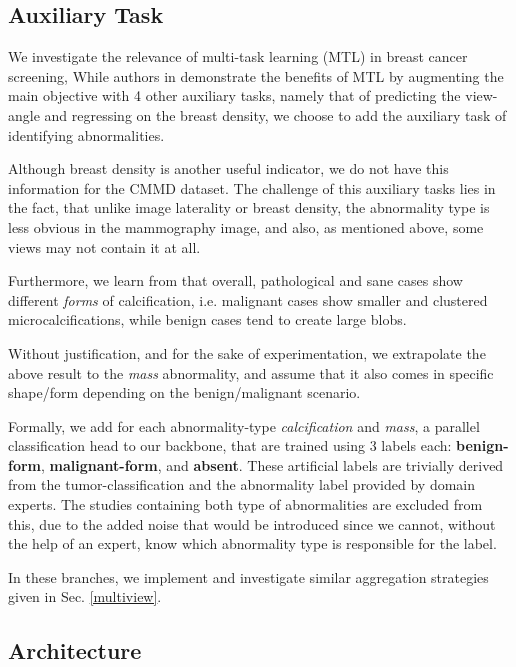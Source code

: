 \documentclass[11pt]{article}
\begin{document}
\subsection{Auxiliary Task}
\label{sec:org0c9880c}

We investigate the relevance of multi-task learning (MTL) in breast cancer screening,
While authors in \autocite{tardy22} demonstrate the benefits of MTL
by augmenting the main objective with
4 other auxiliary tasks, namely that of predicting the view-angle and
regressing on the breast density,
we choose to add the auxiliary task of identifying abnormalities.

Although breast density is another useful indicator, we do not have this information for the CMMD dataset. The challenge of this auxiliary tasks lies in the fact, that unlike image laterality or breast density, the abnormality type is less obvious in the mammography image, and also, as mentioned above, some views may not contain it at all.

Furthermore, we learn from \autocite{azam21} that overall, pathological and sane
cases show different \emph{forms} of calcification, i.e. malignant cases show smaller and clustered
microcalcifications, while benign cases tend to create large blobs.

Without justification, and for the sake of experimentation,
we extrapolate the above result to the \emph{mass} abnormality, and assume
that it also comes in specific shape/form depending on the benign/malignant
scenario.

Formally, we add for each abnormality-type \emph{calcification} and \emph{mass},
a parallel classification head to our backbone, that are trained using
3 labels each: \textbf{benign-form}, \textbf{malignant-form}, and \textbf{absent}.
These artificial labels are trivially derived from the tumor-classification and
the abnormality label provided by domain experts.
The studies containing both type of abnormalities are excluded from this, due to the added noise that would be introduced since we cannot, without the help of an expert, know which abnormality type is responsible for the label.

In these branches, we implement and investigate similar aggregation strategies
given in Sec. \ref{multiview}.

\subsection{Architecture}
\label{sec:org4dc3a82}
\end{document}
